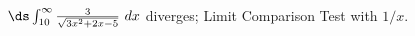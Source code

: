 {$\ds \int_{10}^\infty \frac{3}{\sqrt{3x^2+2x-5}} \ dx$}
{diverges; Limit Comparison Test with $1/x$.}
